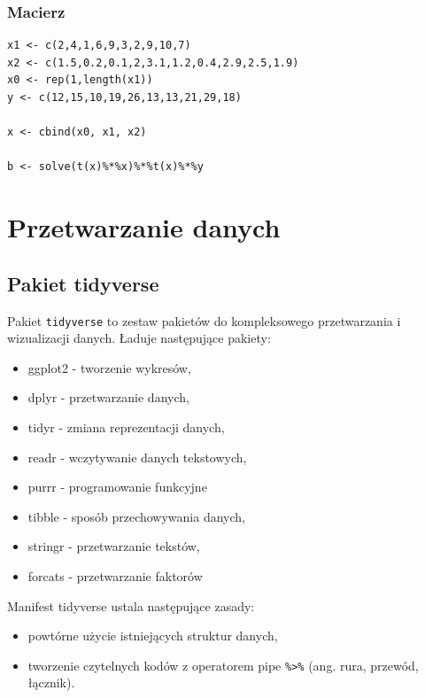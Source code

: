 \documentclass[]{book}
\providecommand{\tightlist}{%
  \setlength{\itemsep}{0pt}\setlength{\parskip}{0pt}}
\begin{document}
\subsection{Macierz}\label{macierz-1}

\begin{verbatim}
x1 <- c(2,4,1,6,9,3,2,9,10,7)
x2 <- c(1.5,0.2,0.1,2,3.1,1.2,0.4,2.9,2.5,1.9)
x0 <- rep(1,length(x1))
y <- c(12,15,10,19,26,13,13,21,29,18)

x <- cbind(x0, x1, x2)

b <- solve(t(x)%*%x)%*%t(x)%*%y
\end{verbatim}

\chapter{Przetwarzanie danych}\label{przetwarzanie-danych}

\section{Pakiet tidyverse}\label{pakiet-tidyverse}

Pakiet \texttt{tidyverse} to zestaw pakietów do kompleksowego
przetwarzania i wizualizacji danych. Ładuje następujące pakiety:

\begin{itemize}
\tightlist
\item
  ggplot2 - tworzenie wykresów,
\item
  dplyr - przetwarzanie danych,
\item
  tidyr - zmiana reprezentacji danych,
\item
  readr - wczytywanie danych tekstowych,
\item
  purrr - programowanie funkcyjne
\item
  tibble - sposób przechowywania danych,
\item
  stringr - przetwarzanie tekstów,
\item
  forcats - przetwarzanie faktorów
\end{itemize}

Manifest tidyverse ustala następujące zasady:

\begin{itemize}
\tightlist
\item
  powtórne użycie istniejących struktur danych,
\item
  tworzenie czytelnych kodów z operatorem pipe
  \texttt{\%\textgreater{}\%} (ang. rura, przewód, łącznik).
\end{itemize}
\end{document}
